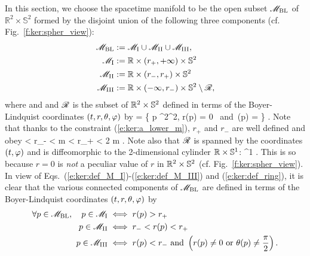In this section, we choose the spacetime manifold to be the open subset $\mathscr{M}_{\rm BL}$
of $\mathbb{R}^2\times\mathbb{S}^2$ formed by the disjoint union of
the following three components (cf. Fig.~\ref{f:ker:spher_view}):
\begin{subequations}
\begin{align}
    \mathscr{M}_{\rm BL} & :=  \mathscr{M}_{\rm I} \cup \mathscr{M}_{\rm II} \cup \mathscr{M}_{\rm III} , \\
    \mathscr{M}_{\rm I} & :=  \mathbb{R}\times(r_+,+\infty)\times\mathbb{S}^2 \label{e:ker:def_M_I}\\
    \mathscr{M}_{\rm II} & :=  \mathbb{R}\times(r_-,r_+)\times\mathbb{S}^2 \\
    \mathscr{M}_{\rm III} & :=  \mathbb{R}\times(-\infty,r_-)\times\mathbb{S}^2 \setminus \mathscr{R}, \label{e:ker:def_M_III}
\end{align}
\end{subequations}
where
\be \label{e:ker:def_r_pm}
     \quad\mbox{and}\quad  {}
\ee
and $\mathscr{R}$ is the subset of $\mathbb{R}^2\times\mathbb{S}^2$ defined in terms of the Boyer-Lindquist coordinates $(t,r,\theta,\varphi)$ by
\be \label{e:ker:def_ring}
    \ring = \left\{ p \in \R^2\times\SS^2,
        \quad r(p) = 0 \ \mbox{and}\ \th(p) =  \right\} .
\ee
Note that thanks to the constraint (\ref{e:ker:a_lower_m}), $r_+$ and $r_-$
are well defined and obey
 < r_- < m < r_+ < 2 m .
\ee
Note also that $\mathscr{R}$ is spanned by the coordinates $(t,\varphi)$ and is diffeomorphic to the 2-dimensional cylinder $\mathbb{R}\times\mathbb{S}^1$:
\be \label{e:ker:ring_R_S1}
    \ring \simeq \R\times\SS^1 .
\ee
This is so because $r=0$ is \emph{not} a peculiar value of $r$ in $\mathbb{R}^2\times\mathbb{S}^2$
(cf. Fig.~\ref{f:ker:spher_view}).
In view of Eqs.~(\ref{e:ker:def_M_I})-(\ref{e:ker:def_M_III}) and (\ref{e:ker:def_ring}), it is clear that
the various connected components of $\mathscr{M}_{\rm BL}$ are defined in terms of the
Boyer-Lindquist coordinates $(t,r,\theta,\varphi)$ by
\begin{subequations}
\label{e:ker:M_I_III_r}
\begin{align}
  \forall p \in  \mathscr{M}_{\rm BL},\quad p \in \mathscr{M}_{\rm I} & \iff r(p) > r_+ \\
    \quad p \in \mathscr{M}_{\rm II} & \iff r_- < r(p) < r_+ \\
    \quad p \in \mathscr{M}_{\rm III} & \iff r(p) < r_-\ \mbox{and}\
    \left( r(p) \not=0 \ \mbox{or}\ \theta(p) \not=\frac{\pi}{2} \right) .
\end{align}
\end{subequations}


